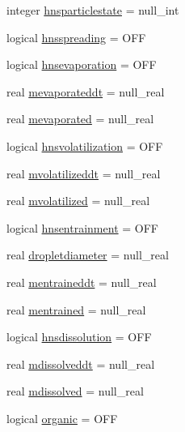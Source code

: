 \begin{DoxyCompactItemize}
\item 
integer \mbox{\hyperlink{structmodulehns_1_1t__var_a52f6b28de372ab36d97e64101e9e6125}{hnsparticlestate}} = null\+\_\+int
\item 
logical \mbox{\hyperlink{structmodulehns_1_1t__var_a3162903d2e1a5e1be0ba2c1a9ef84f41}{hnsspreading}} = O\+FF
\item 
logical \mbox{\hyperlink{structmodulehns_1_1t__var_ae8defcd6ea33e0bf5a55233caccbcd49}{hnsevaporation}} = O\+FF
\item 
real \mbox{\hyperlink{structmodulehns_1_1t__var_a0f2084e69e5df8462500255154f3a834}{mevaporateddt}} = null\+\_\+real
\item 
real \mbox{\hyperlink{structmodulehns_1_1t__var_aea67df90831701249ad2b1cc169f505a}{mevaporated}} = null\+\_\+real
\item 
logical \mbox{\hyperlink{structmodulehns_1_1t__var_a4389d859ab90873d69784633cc44951b}{hnsvolatilization}} = O\+FF
\item 
real \mbox{\hyperlink{structmodulehns_1_1t__var_a292ae28cdb83de18990633e22defcfa2}{mvolatilizeddt}} = null\+\_\+real
\item 
real \mbox{\hyperlink{structmodulehns_1_1t__var_ad004ff4815f2580a69d0cc64bed8edf5}{mvolatilized}} = null\+\_\+real
\item 
logical \mbox{\hyperlink{structmodulehns_1_1t__var_a6d563836323ea8982950232d57c2fc11}{hnsentrainment}} = O\+FF
\item 
real \mbox{\hyperlink{structmodulehns_1_1t__var_a3ad14b8dedf2c093d6833b5638dd568f}{dropletdiameter}} = null\+\_\+real
\item 
real \mbox{\hyperlink{structmodulehns_1_1t__var_a4461ba456a91a5960a2f2381d16f69c9}{mentraineddt}} = null\+\_\+real
\item 
real \mbox{\hyperlink{structmodulehns_1_1t__var_a112a3174b898f3d83ed2c03f9feaa78d}{mentrained}} = null\+\_\+real
\item 
logical \mbox{\hyperlink{structmodulehns_1_1t__var_af0507b9fef05b2054392b4c31f5fce36}{hnsdissolution}} = O\+FF
\item 
real \mbox{\hyperlink{structmodulehns_1_1t__var_a4b6966dd2be3f372db109cbb76ccad44}{mdissolveddt}} = null\+\_\+real
\item 
real \mbox{\hyperlink{structmodulehns_1_1t__var_a5090ad0527cbafbad9dc97e34f1f1b9e}{mdissolved}} = null\+\_\+real
\item 
logical \mbox{\hyperlink{structmodulehns_1_1t__var_a498d478d92a527201a7fc0fd0276c308}{organic}} = O\+FF
\item 

\end{DoxyCompactItemize}

